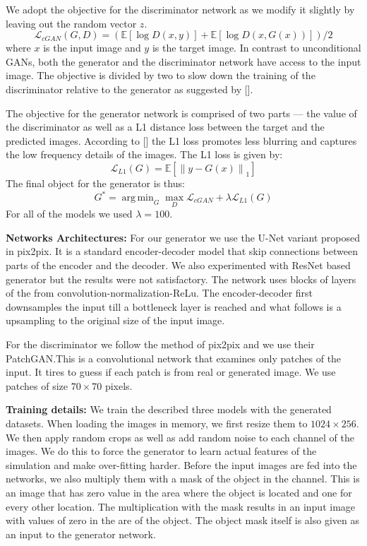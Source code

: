 \documentclass{llncs}
\DeclareMathOperator*{\argminA}{arg\,min} %
\begin{document}
We adopt the objective for the discriminator network as we modify it slightly by leaving out the random vector $z$.
\begin{equation}
\mathcal{L}_{cGAN} (G, D) = (\mathbb{E}[\log D (x,y)] + \mathbb{E}[\log D (x, G(x))])/2
\end{equation}
where $x$ is the input image and $y$ is the target image. In contrast to unconditional GANs, both the generator and the discriminator network have access to the input image. The objective is divided by two to slow down the training of the discriminator relative to the generator as suggested by [].

The objective for the generator network is comprised of two parts --- the value of the discriminator as well as a L1 distance loss between the target and the predicted images. According to [] the L1 loss promotes less blurring and captures the low frequency details of the images. The L1 loss is given by:
\begin{equation}
\mathcal{L}_{L1} (G) = \mathbb{E}[\left\lVert y - G(x)\right\rVert_1]
\end{equation}
The final object for the generator is thus:
\begin{equation}
G^* = \argminA_G \max_D \mathcal{L}_{cGAN}  + \lambda \mathcal{L}_{L1} (G)
\end{equation}
For all of the models we used $\lambda = 100$.

\noindent\textbf{Networks Architectures:} For our generator we use the U-Net variant proposed in pix2pix. It is a standard encoder-decoder model that skip connections between parts of the encoder and the decoder. We also experimented with ResNet based generator but the results were not satisfactory. The network uses blocks of layers of the from convolution-normalization-ReLu. The encoder-decoder first downsamples the input till a bottleneck layer is reached and what follows is a upsampling to the original size of the input image.

For the discriminator we follow the method of pix2pix and we use their PatchGAN.\@ This is a convolutional network that examines only patches of the input. It tires to guess if each patch is from real or generated image. We use patches of size $70\times 70$ pixels.

\noindent\textbf{Training details:} We train the described three models with the generated datasets. When loading the images in memory, we first resize them to $1024\times 256$. We then apply random crops as well as add random noise to each channel of the images. We do this to force the generator to learn actual features of the simulation and make over-fitting harder. Before the input images are fed into the networks, we also multiply them with a mask of the object in the channel. This is an image that has zero value in the area where the object is located and one for every other location. The multiplication with the mask results in an input image with values of zero in the are of the object. The object mask itself is also given as an input to the generator network.
\end{document}

